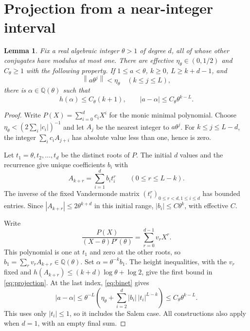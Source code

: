 \documentclass[11pt]{article}
\newtheorem{lemma}[theorem]{Lemma}
\newcommand{\Q}{\mathbb Q}
\newcommand{\dist}[1]{\left\|#1\right\|}
\begin{document}
\section{Projection from a near-integer interval}
\begin{lemma}\label{lem:projection}
Fix a real algebraic integer $\theta>1$ of degree $d$, all of whose
other conjugates have modulus at most one. There are effective
$\eta_\theta\in(0,1/2)$ and $C_\theta\geq1$ with the following
property. If $1\leq a<\theta$, $k\geq0$, $L\geq k+d-1$, and
\[
 \dist{a\theta^j}<\eta_\theta\quad(k\leq j\leq L),
\]
there is $\alpha\in\Q(\theta)$ such that
\begin{equation}\label{eq:projection}
 h(\alpha)\leq C_\theta(k+1),\qquad
 |a-\alpha|\leq C_\theta\theta^{k-L}.
\end{equation}
\end{lemma}
\begin{proof}
Write $P(X)=\sum_{i=0}^d c_iX^i$ for the monic minimal polynomial.
Choose $\eta_\theta<(2\sum_i|c_i|)^{-1}$ and let $A_j$ be the
nearest integer to $a\theta^j$. For $k\leq j\leq L-d$, the integer
$\sum_i c_iA_{j+i}$ has absolute value less than one, hence is zero.

Let $t_1=\theta,t_2,\ldots,t_d$ be the distinct roots of $P$.
The initial $d$ values and the recurrence give unique coefficients $b_i$
with
\begin{equation}\label{eq:binet}
 A_{k+r}=\sum_{i=1}^d b_it_i^r\qquad(0\leq r\leq L-k).
\end{equation}
The inverse of the fixed Vandermonde matrix $(t_i^r)_{0\leq r<d,1\leq i\leq d}$
has bounded entries. Since $|A_{k+r}|\leq2\theta^{k+d}$ in this initial
range, $|b_i|\leq C\theta^k$, with effective $C$.

Write
\[
 \frac{P(X)}{(X-\theta)P'(\theta)}=\sum_{r=0}^{d-1}v_rX^r.
\]
This polynomial is one at $t_1$ and zero at the other roots, so
$b_1=\sum_rv_rA_{k+r}\in\Q(\theta)$. Set $\alpha=\theta^{-k}b_1$.
The height inequalities, with the $v_r$ fixed and
$h(A_{k+r})\leq(k+d)\log\theta+\log2$, give the first bound
in \eqref{eq:projection}. At the last index, \eqref{eq:binet} gives
\[
 |a-\alpha|
 \leq\theta^{-L}\left(\eta_\theta+
              \sum_{i=2}^d |b_i|\,|t_i|^{L-k}\right)
 \leq C_\theta\theta^{k-L}.
\]
This uses only $|t_i|\leq1$, so it includes the Salem case.
All constructions also apply when $d=1$, with an empty final sum.
\end{proof}
\end{document}
